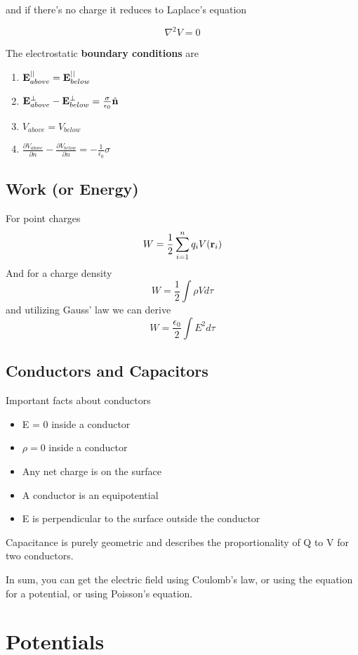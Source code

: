 \documentclass{article}
\newcommand{\vh}[1]{\hat{\vb{#1}}}
\begin{document}
and if there's no charge it reduces to Laplace's equation

$$
\nabla^2 V = 0
$$

The electrostatic \textbf{boundary conditions} are

\begin{enumerate}
    \item $\vb{E}^{||}_{above} = \vb{E}^{||}_{below}$
    \item $\vb{E}^{\perp}_{above} - \vb{E}^{\perp}_{below} = \frac{\sigma}{\epsilon_0}\vh{n}$
    \item $V_{above} = V_{below}$
    \item $\frac{\partial V_{above}}{\partial n} - \frac{\partial V_{below}}{\partial n}  = -\frac{1}{\epsilon_0}\sigma $
\end{enumerate}

\subsection{Work (or Energy)}

For point charges
$$
W = \frac{1}{2} \sum_{i=1}^n q_iV(\vb{r}_i)
$$
And for a charge density
$$
W = \frac{1}{2} \int \rho V d\tau
$$
and utilizing Gauss' law we can derive
$$
W = \frac{\epsilon_0}{2} \int E^2 d\tau
$$

\subsection{Conductors and Capacitors}
Important facts about conductors
\begin{itemize}
    \item E = 0 inside a conductor
    \item $\rho = 0$ inside a conductor
    \item Any net charge is on the surface
    \item A conductor is an equipotential
    \item E is perpendicular to the surface outside the conductor
\end{itemize}

Capacitance is purely geometric and describes the proportionality of Q to V for two conductors.

In sum, you can get the electric field using Coulomb's law, or using the equation for a potential, or using Poisson's equation.

\section{Potentials}
\end{document}
